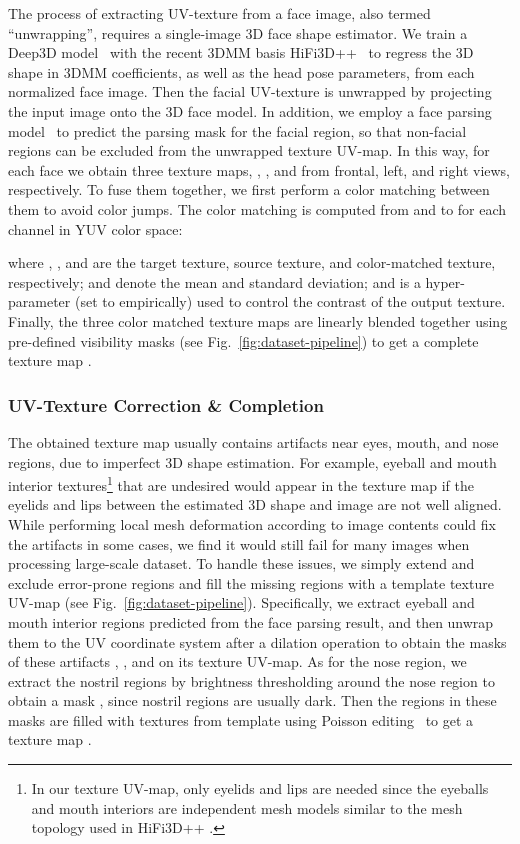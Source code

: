 \documentclass[10pt,twocolumn,letterpaper]{article}
\begin{document}
The process of extracting UV-texture from a face image, also termed ``unwrapping'', requires a single-image 3D face shape estimator. 
We train a Deep3D model~\cite{deng2019accurate} with the recent 3DMM basis HiFi3D++~\cite{chai2022realy} to regress the 3D shape in 3DMM coefficients, as well as the head pose parameters, from each normalized face image. 
Then the facial UV-texture is unwrapped by projecting the input image onto the 3D face model. 
In addition, we employ a face parsing model~\cite{zllrunningfaceparsing} to predict the parsing mask for the facial region, so that non-facial regions can be excluded from the unwrapped texture UV-map.
In this way, for each face we obtain three texture maps, , , and  from frontal, left, and right views, respectively. 
To fuse them together, we first perform a color matching between them to avoid color jumps. 
The color matching is computed from  and  to  for each channel in YUV color space: 

where , , and  are the target texture, source texture, and color-matched texture, respectively;  and  denote the mean and standard deviation; and  is a hyper-parameter (set to  empirically) used to control the contrast of the output texture.
Finally, the three color matched texture maps are linearly blended together using pre-defined visibility masks (see Fig.~\ref{fig:dataset-pipeline}) to get a complete texture map .


\vspace{-4mm}
\subsubsection{UV-Texture Correction \& Completion}
\label{sec:tex-completion}
\vspace{-2mm}


The obtained texture map  usually contains artifacts near eyes, mouth, and nose regions, due to imperfect 3D shape estimation.
For example, eyeball and mouth interior textures\footnote{In our texture UV-map, only eyelids and lips are needed since the eyeballs and mouth interiors are independent mesh models similar to the mesh topology used in HiFi3D++ \cite{chai2022realy}.} that are undesired would appear in the texture map if the eyelids and lips between the estimated 3D shape and image are not well aligned. 
While performing local mesh deformation according to image contents \cite{zhou2019deep} could fix the artifacts in some cases, we find it would still fail for many images when processing large-scale dataset. 
To handle these issues, we simply extend and exclude error-prone regions and fill the missing regions with a template texture UV-map  (see Fig.~\ref{fig:dataset-pipeline}).
Specifically, we extract eyeball and mouth interior regions predicted from the face parsing result, and then unwrap them to the UV coordinate system after a dilation operation to obtain the masks of these artifacts , , and  on its texture UV-map.
As for the nose region, we extract the nostril regions by brightness thresholding around the nose region to obtain a mask , since nostril regions are usually dark. 
Then the regions in these masks are filled with textures from template  using Poisson editing~\cite{perez2003poisson} to get a texture map . 
\end{document}
